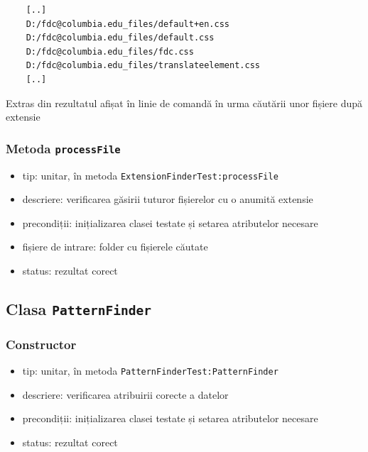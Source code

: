 \documentclass[12pt]{article}
\begin{document}
\newpage

\vspace{0.3cm}
\begin{listing}[ht]
    \begin{verbatim}
    [..]
    D:/fdc@columbia.edu_files/default+en.css
    D:/fdc@columbia.edu_files/default.css
    D:/fdc@columbia.edu_files/fdc.css
    D:/fdc@columbia.edu_files/translateelement.css
    [..]
    \end{verbatim}
    \caption{Extras din rezultatul afișat în linie de comandă în urma căutării unor fișiere după extensie}
    \label{listing:1}
\end{listing}
\vspace{0.3cm}

\subsubsection{Metoda \texttt{processFile}}

\begin{itemize}
    \item tip: unitar, în metoda \texttt{ExtensionFinderTest:processFile}
    \item descriere: verificarea găsirii tuturor fișierelor cu o anumită extensie
    \item precondiții: inițializarea clasei testate și setarea atributelor necesare
    \item fișiere de intrare: folder cu fișierele căutate
    \item status: rezultat corect
\end{itemize}

\subsection{Clasa \texttt{PatternFinder}}

\subsubsection{Constructor}

\begin{itemize}
    \item tip: unitar, în metoda \texttt{PatternFinderTest:PatternFinder}
    \item descriere: verificarea atribuirii corecte a datelor
    \item precondiții: inițializarea clasei testate și setarea atributelor necesare
    \item status: rezultat corect
\end{itemize}
\end{document}
